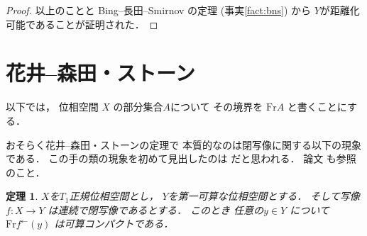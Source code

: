 \documentclass[leqno, a4paper, 12pt]{jsarticle}
\newtheorem{thm}{定理}
\newcommand{\bound}{\mathrm{Fr}}
\newcommand{\myinv}[1]{#1^{\gets}}
\begin{document}
\begin{proof}
以上のことと
Bing--長田--Smirnov
の定理
(事実\ref{fact:bns})
から
$Y$が距離化可能であることが証明された．
\end{proof}




\section{花井--森田・ストーン}\label{sec:hms}

以下では，
位相空間
$X$
の部分集合$A$について
その境界を
$\bound A$
と書くことにする．

おそらく花井--森田・ストーンの定理で
本質的なのは閉写像に関する以下の現象である．
この手の類の現象を初めて見出したのは
\cite{vainstein1947closed}
だと思われる．
論文
\cite{MR0177396}
も参照のこと．

\begin{thm}\label{thm:closedmapbound}
$X$を$T_{1}$正規位相空間とし，
$Y$を第一可算な位相空間とする．
そして写像$f\colon X\to Y$
は連続で閉写像であるとする．
このとき
任意の$y\in Y$
について
$\bound \myinv{f}(y)$
は可算コンパクトである．

\end{thm}
\end{document}
